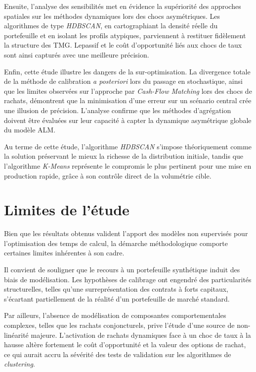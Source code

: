 Ensuite, l'analyse des sensibilités met en évidence la supériorité des approches spatiales sur les méthodes dynamiques lors des chocs asymétriques. Les algorithmes de type \textit{HDBSCAN}, en cartographiant la densité réelle du portefeuille et en isolant les profils atypiques, parviennent à restituer fidèlement la structure des TMG. Lepassif et le coût d'opportunité liés aux chocs de taux sont ainsi capturés avec une meilleure précision.

Enfin, cette étude illustre les dangers de la sur-optimisation. La divergence totale de la méthode de calibration \textit{a posteriori} lors du passage en stochastique, ainsi que les limites observées sur l'approche par \textit{Cash-Flow Matching} lors des chocs de rachats, démontrent que la minimisation d'une erreur sur un scénario central crée une illusion de précision. L'analyse confirme que les méthodes d'agrégation doivent être évaluées sur leur capacité à capter la dynamique asymétrique globale du modèle ALM.

Au terme de cette étude, l'algorithme \textit{HDBSCAN} s'impose théoriquement comme la solution préservant le mieux la richesse de la distribution initiale, tandis que l'algorithme \textit{K-Means} représente le compromis le plus pertinent pour une mise en production rapide, grâce à son contrôle direct de la volumétrie cible.

\section*{Limites de l'étude}

Bien que les résultats obtenus valident l'apport des modèles non supervisés pour l'optimisation des temps de calcul, la démarche méthodologique comporte certaines limites inhérentes à son cadre.

Il convient de souligner que le recours à un portefeuille synthétique induit des biais de modélisation. Les hypothèses de calibrage ont engendré des particularités structurelles, telles qu'une surreprésentation des contrats à forts capitaux, s'écartant partiellement de la réalité d'un portefeuille de marché standard. 

Par ailleurs, l'absence de modélisation de composantes comportementales complexes, telles que les rachats conjoncturels, prive l'étude d'une source de non-linéarité majeure. L'activation de rachats dynamiques face à un choc de taux à la hausse altère fortement le coût d'opportunité et la valeur des options de rachat, ce qui aurait accru la sévérité des tests de validation sur les algorithmes de \textit{clustering}.

